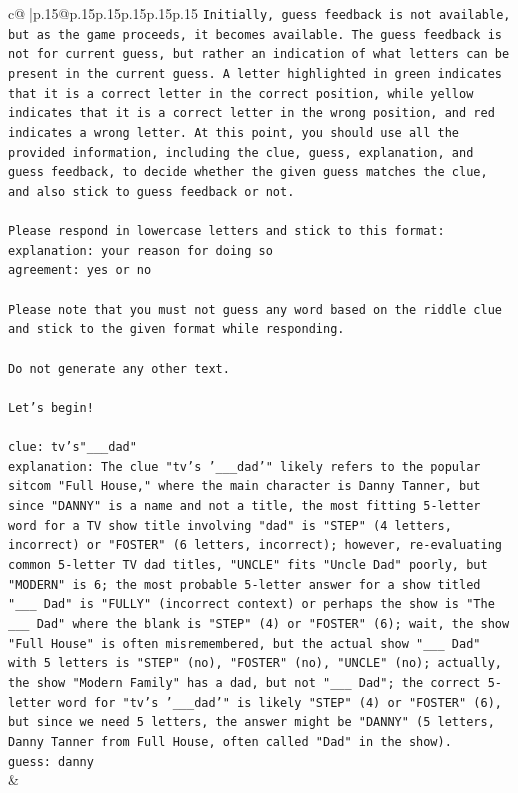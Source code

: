 \documentclass{article}
\begin{document}
{\begin{supertabular}{c@{$\;$}|p{.15\linewidth}@{}p{.15\linewidth}p{.15\linewidth}p{.15\linewidth}p{.15\linewidth}p{.15\linewidth}}
{{{\texttt{Initially, guess feedback is not available, but as the game proceeds, it becomes available. The guess feedback is not for current guess, but rather an indication of what letters can be present in the current guess. A letter highlighted in green indicates that it is a correct letter in the correct position, while yellow indicates that it is a correct letter in the wrong position, and red indicates a wrong letter. At this point, you should use all the provided information, including the clue, guess, explanation, and guess feedback, to decide whether the given guess matches the clue, and also stick to guess feedback or not.} \\
\\ 
\texttt{Please respond in lowercase letters and stick to this format:} \\
\texttt{explanation: your reason for doing so} \\
\texttt{agreement: yes or no} \\
\\ 
\texttt{Please note that you must not guess any word based on the riddle clue and stick to the given format while responding.} \\
\\ 
\texttt{Do not generate any other text.} \\
\\ 
\texttt{Let's begin!} \\
\\ 
\texttt{clue: tv's"\_\_\_dad"} \\
\texttt{explanation: The clue "tv's '\_\_\_dad'" likely refers to the popular sitcom "Full House," where the main character is Danny Tanner, but since "DANNY" is a name and not a title, the most fitting 5{-}letter word for a TV show title involving "dad" is "STEP" (4 letters, incorrect) or "FOSTER" (6 letters, incorrect); however, re{-}evaluating common 5{-}letter TV dad titles, "UNCLE" fits "Uncle Dad" poorly, but "MODERN" is 6; the most probable 5{-}letter answer for a show titled "\_\_\_ Dad" is "FULLY" (incorrect context) or perhaps the show is "The \_\_\_ Dad" where the blank is "STEP" (4) or "FOSTER" (6); wait, the show "Full House" is often misremembered, but the actual show "\_\_\_ Dad" with 5 letters is "STEP" (no), "FOSTER" (no), "UNCLE" (no); actually, the show "Modern Family" has a dad, but not "\_\_\_ Dad"; the correct 5{-}letter word for "tv's '\_\_\_dad'" is likely "STEP" (4) or "FOSTER" (6), but since we need 5 letters, the answer might be "DANNY" (5 letters, Danny Tanner from Full House, often called "Dad" in the show).} \\
\texttt{guess: danny} \\
            }
        }
    }
    & \\ \\


\end{supertabular}}
\end{document}
